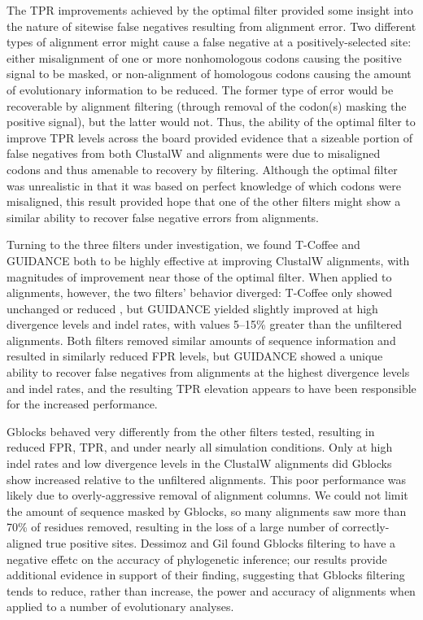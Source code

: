 \documentclass{article}
\begin{document}
The TPR improvements achieved by the optimal filter provided some
insight into the nature of sitewise false negatives resulting from
alignment error. Two different types of alignment error might cause a
false negative at a positively-selected site: either misalignment of
one or more nonhomologous codons causing the positive signal to be
masked, or non-alignment of homologous codons causing the amount of
evolutionary information to be reduced. The former type of error would
be recoverable by alignment filtering (through removal of the codon(s)
masking the positive signal), but the latter would not. Thus, the
ability of the optimal filter to improve TPR levels across the board
provided evidence that a sizeable portion of false negatives from both
ClustalW and \prankc alignments were due to misaligned codons and thus
amenable to recovery by filtering. Although the optimal filter was
unrealistic in that it was based on perfect knowledge of which codons
were misaligned, this result provided hope that one of the other
filters might show a similar ability to recover false negative errors
from \prankc alignments.

Turning to the three filters under investigation, we found T-Coffee
and GUIDANCE both to be highly effective at improving ClustalW
alignments, with magnitudes of improvement near those of the optimal
filter. When applied to \prankc alignments, however, the two filters'
behavior diverged: T-Coffee only showed unchanged or reduced \tpr, but
GUIDANCE yielded slightly improved \tpr at high divergence levels and
indel rates, with values 5--15\% greater than the unfiltered \prankc
alignments. Both filters removed similar amounts of sequence
information and resulted in similarly reduced FPR levels, but GUIDANCE
showed a unique ability to recover false negatives from \prankc
alignments at the highest divergence levels and indel rates, and the
resulting TPR elevation appears to have been responsible for the
increased \tpr performance.

Gblocks behaved very differently from the other filters tested,
resulting in reduced FPR, TPR, and \tpr under nearly all simulation
conditions. Only at high indel rates and low divergence levels in the
ClustalW alignments did Gblocks show increased \tpr relative to the
unfiltered alignments. This poor performance was likely due to
overly-aggressive removal of alignment columns. We could not limit the
amount of sequence masked by Gblocks, so many alignments saw more than
70\% of residues removed, resulting in the loss of a large number of
correctly-aligned true positive sites. Dessimoz and Gil
\citeyearpar{Dessimoz2010Phylogenetic} found Gblocks filtering to have
a negative effetc on the accuracy of phylogenetic inference; our
results provide additional evidence in support of their finding,
suggesting that Gblocks filtering tends to reduce, rather than
increase, the power and accuracy of alignments when applied to a
number of evolutionary analyses.
\end{document}
